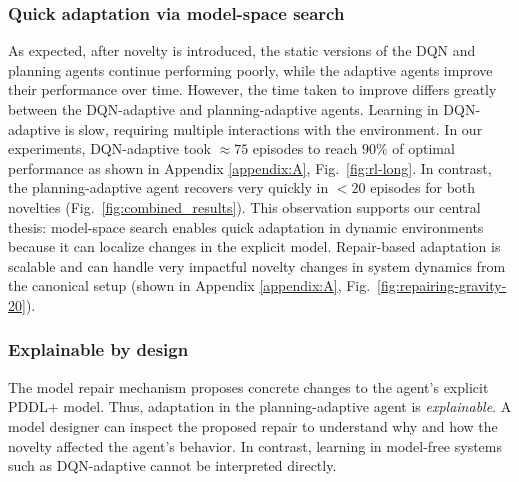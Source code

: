 \documentclass[letterpaper]{article} %
\begin{document}
\subsubsection{Quick adaptation via model-space search} As expected, after novelty is introduced, the static versions of the DQN and planning agents continue performing poorly, while the adaptive agents improve their performance over time. However, the time taken to improve differs greatly between the DQN-adaptive and planning-adaptive agents.
Learning in DQN-adaptive is slow, requiring multiple interactions with the environment. In our experiments, DQN-adaptive took $\approx75$ episodes to reach $90\%$ of optimal performance as shown in Appendix \ref{appendix:A}, Fig.~\ref{fig:rl-long}. In contrast, the planning-adaptive agent recovers very quickly in $<20$ episodes for both novelties (Fig.~\ref{fig:combined_results}). This observation supports our central thesis: model-space search enables quick adaptation in dynamic environments because it can localize changes in the explicit model. Repair-based adaptation is scalable and can handle very impactful novelty changes in system dynamics from the canonical setup (shown in Appendix \ref{appendix:A}, Fig.~\ref{fig:repairing-gravity-20}).

\subsubsection{Explainable by design}
The model repair mechanism proposes concrete changes to the agent's explicit PDDL+ model. Thus, adaptation in the planning-adaptive agent is \emph{explainable}. A model designer can inspect the proposed repair to understand why and how the novelty affected the agent's behavior. In contrast, learning in model-free systems such as DQN-adaptive cannot be interpreted directly.
\end{document}

